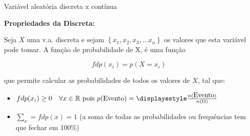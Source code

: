 \documentclass{beamer}
\begin{document}
\begin{frame}{Variável aleatória discreta x contínua}

\textbf{Propriedades da Discreta:}

Seja $X$ uma v.a. discreta e sejam $\left\{ x_{1}, x_{2}, x_{3},...x_{n} \right\}$ os valores que esta variável pode tomar. A função de probabilidade de X, é uma função

$$
fdp(x_{i})=p(X=x_{i})
$$

que permite calcular as probabilidades de todos os valores de $X$, tal que:
\begin{itemize}
    \item $fdp(x_{i})\geq 0\quad \forall x \in \mathbb{R}\,\,\mbox{pois}\,\,p(\mbox{Evento})=\displayestyle\frac{n(\mbox{Evento})}{n(\Omega)}$
    \item $\displaystyle\sum_{x}=fdp(x)=1$ (a soma de todas as probabilidades ou frequências tem que fechar em 100\%)
\end{itemize}


\end{frame}
\end{document}
